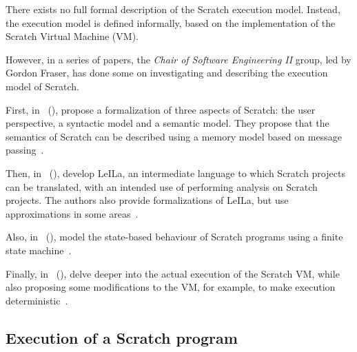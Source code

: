 \documentclass[../main]{subfiles}
\begin{document}
There exists no full formal description of the Scratch execution model.
Instead, the execution model is defined informally, based on the implementation of the Scratch Virtual Machine (VM).

However, in a series of papers, the \emph{Chair of Software Engineering II} group, led by Gordon Fraser, has done some on investigating and describing the execution model of Scratch.

First, in~ (\citeyear{stahlbauerTestingScratchPrograms2019}), \citeauthor{stahlbauerTestingScratchPrograms2019} propose a formalization of three aspects of Scratch: the user perspective, a syntactic model and a semantic model.
They propose that the semantics of Scratch can be described using a memory model based on message passing~\autocite{stahlbauerTestingScratchPrograms2019}.

Then, in~ (\citeyear{stahlbauerVerifiedScratchProgram2020}), \citeauthor{stahlbauerVerifiedScratchProgram2020} develop LeILa, an intermediate language to which Scratch projects can be translated, with an intended use of performing analysis on Scratch projects.
The authors also provide formalizations of LeILa, but use approximations in some areas~\autocite{stahlbauerVerifiedScratchProgram2020}.

Also, in~ (\citeyear{gotzModelbasedTestingScratch2022}), \citeauthor{gotzModelbasedTestingScratch2022} model the state-based behaviour of Scratch programs using a finite state machine~\autocite{gotzModelbasedTestingScratch2022}.

Finally, in~ (\citeyear{deinerAutomatedTestGeneration2023}), \citeauthor{deinerAutomatedTestGeneration2023} delve deeper into the actual execution of the Scratch VM, while also proposing some modifications to the VM, for example, to make execution deterministic~\autocite{deinerAutomatedTestGeneration2023}.


\subsection{Execution of a Scratch program}\label{subsec:execution-of-a-scratch-program}
\end{document}
